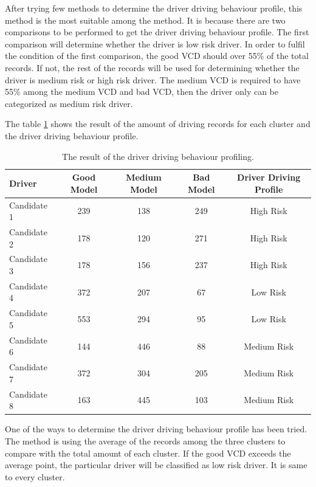 After trying few methods to determine the driver driving behaviour profile, this method is the most suitable among the method. It is because there are two comparisons to be performed to get the driver driving behaviour profile. The first comparison will determine whether the driver is low risk driver. In order to fulfil the condition of the first comparison, the good VCD should over 55\% of the total records. If not, the rest of the records will be used for determining whether the driver is medium risk or high risk driver. The medium VCD is required to have 55\% among the medium VCD and bad VCD, then the driver only can be categorized as medium risk driver.

The table \ref{tbl:result} shows the result of the amount of driving records for each cluster and the driver driving behaviour profile.

\begin{table}[h!]
\begin{tabular}{|l|c|c|c|c|}
\hline
Driver & Good Model & Medium Model & Bad Model & Driver Driving Profile \\

\hline
Candidate 1 & 239 & 138 & 249 & High Risk\\

\hline
Candidate 2 & 178 & 120 & 271 & High Risk\\
  
\hline
Candidate 3 & 178 & 156 & 237 & High Risk\\

\hline
Candidate 4 & 372 & 207 & 67 & Low Risk\\

\hline
Candidate 5 & 553 & 294 & 95 & Low Risk\\

\hline
Candidate 6 & 144 & 446 & 88 & Medium Risk\\

\hline
Candidate 7 & 372 & 304 & 205 & Medium Risk\\

\hline
Candidate 8 & 163 & 445 & 103 & Medium Risk\\

\hline
\end{tabular}
\label{tbl:result}
\caption{The result of the driver driving behaviour profiling.}    
\end{table}

One of the ways to determine the driver driving behaviour profile has been tried. The method is using the average of the records among the three clusters to compare with the total amount of each cluster. If the good VCD exceeds the average point, the particular driver will be classified as low risk driver. It is same to every cluster.

